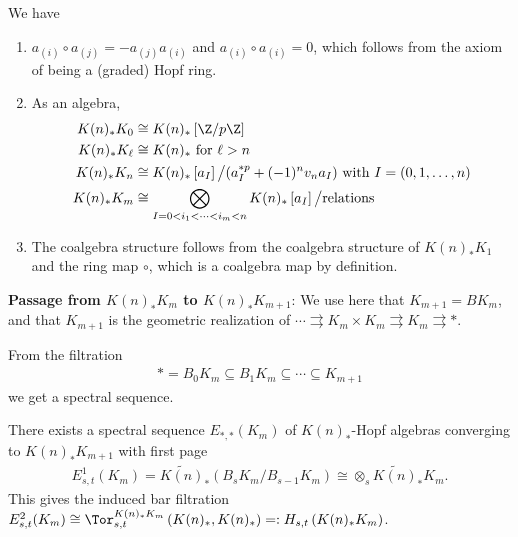 \begin{theorem} We have
\begin{enumerate}
    \item $a_{(i)} \circ a_{(j)} = - a_{(j)} a_{(i)}$ and $a_{(i)} \circ a_{(i)} = 0$, which follows from the axiom of being a (graded) Hopf ring.
    \item As an algebra,
    \begin{align*}
        K(n)_\ast K_0 &\cong K(n)_\ast \left[ \Z/p\Z \right] \\
        K(n)_\ast K_\ell &\cong K(n)_\ast \text{ for } \ell > n \\
        K(n)_\ast K_n &\cong K(n)_\ast \left[ a_I \right]\big/(a_I^{\ast p} + (-1)^n v_n a_I) \text{ with } I = (0,1, \ldots, n) \\
        K(n)_\ast K_m &\cong \bigotimes_{I = 0< i_1 < \cdots < i_m < n}K(n)_\ast \left[ a_I \right]\big/\text{relations}
    \end{align*}

    \item The coalgebra structure follows from the coalgebra structure of $K(n)_\ast K_1$ and the ring map $\circ$, which is a coalgebra map by definition.
\end{enumerate}
\end{theorem}

\textbf{Passage from $K(n)_\ast K_m$ to $K(n)_\ast K_{m+1}$}: We use here that $K_{m+1} = BK_m$, and that $K_{m+1}$ is the geometric realization of $ \cdots \rightrightarrows K_m \times K_m \rightrightarrows K_m \rightrightarrows \ast$.

From the filtration
\begin{align*}
    \ast = B_0 K_m \subseteq B_1 K_m \subseteq \cdots \subseteq K_{m+1}
\end{align*}
we get a spectral sequence.

\begin{theorem} There exists a spectral sequence $E_{\ast,\ast}(K_m)$ of $K(n)_\ast$-Hopf algebras converging to $K(n)_\ast K_{m+1}$ with first page
\begin{align*}
    E_{s,t}^1(K_m) = \widetilde{K(n)}_\ast \left( B_s K_m / B_{s-1} K_m \right) \cong \otimes_s \widetilde{K(n)}_\ast K_m.
\end{align*}
This gives the induced bar filtration $E_{s,t}^2(K_m) \cong \Tor_{s,t}^{K(n)_\ast K_m} \left( K(n)_\ast, K(n)_\ast \right) =: H_{s,t} \left( K(n)_\ast K_m \right)$.
\end{theorem}


